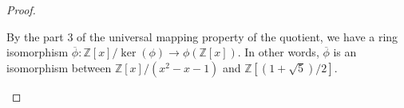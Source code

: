 \documentclass[12pt, psamsfonts]{amsart}
\theoremstyle{definition}
\theoremstyle{remark}
\numberwithin{equation}{section}
\begin{document}
\begin{proof}
\begin{enumerate}
      By the part 3 of the universal mapping property of the quotient, we have a ring isomorphism $\overline{\phi}: \mathbb{Z}[x]/\ker(\phi) \rightarrow \phi(\mathbb{Z}[x])$.
      In other words, $\overline{\phi}$ is an isomorphism between $\mathbb{Z}[x]/(x^2 - x- 1)$ and $\mathbb{Z}[(1 + \sqrt{5})/2]$.

  \end{enumerate}
\end{proof}
\end{document}
